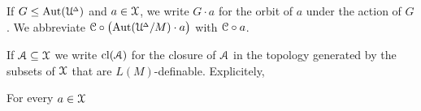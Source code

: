 If $G\le{\rm Aut}(\EuScript U\kern-.2ex^{\scriptscriptstyle\Delta})$ and $a\in\EuScript X$, we write $G{\cdot}a$ for the orbit of $a$ under the action of $G$.
We abbreviate $\EuScript C\circ\big({\rm Aut}(\EuScript U\kern-.2ex^{\scriptscriptstyle\Delta}/M)\cdot a\big)$ with $\EuScript C\circ a$.

If $\EuScript A\subseteq\EuScript X$ we write ${\rm cl}(\EuScript A)$ for the closure of $\EuScript A$ in the topology generated by the subsets of $\EuScript X$ that are $L(M)$-definable.
Explicitely,






  


\begin{fact}
  For every $a\in\EuScript X$\smallskip

\end{fact}

